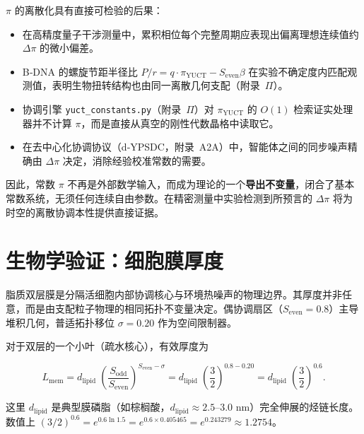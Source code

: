 \documentclass[12pt,a4paper]{article}
\theoremstyle{remark}
\begin{document}
	\(\pi\) 的离散化具有直接可检验的后果：
	\begin{itemize}
		\item 在高精度量子干涉测量中，累积相位每个完整周期应表现出偏离理想连续值约 \(\Delta\pi\) 的微小偏差。
		\item B‑DNA 的螺旋节距半径比 \(P/r = q\cdot\pi_{\mathrm{YUCT}} - S_{\mathrm{even}}\beta\) 在实验不确定度内匹配观测值，表明生物扭转结构也由同一离散几何支配（附录~\(\Pi\)）。
		\item 协调引擎 \texttt{yuct\_constants.py}（附录~\(\Pi\)）对 \(\pi_{\mathrm{YUCT}}\) 的 \(O(1)\) 检索证实处理器并不计算 \(\pi\)，而是直接从真空的刚性代数晶格中读取它。
		\item 在去中心化协调协议（d‑YPSDC，附录~A2A）中，智能体之间的同步噪声精确由 \(\Delta\pi\) 决定，消除经验校准常数的需要。
	\end{itemize}
	
	因此，常数 \(\pi\) 不再是外部数学输入，而成为理论的一个\textbf{导出不变量}，闭合了基本常数系统，无须任何连续自由参数。在精密测量中实验检测到所预言的 \(\Delta\pi\) 将为时空的离散协调本性提供直接证据。
	
	\section{生物学验证：细胞膜厚度}
	\label{sec:bio-membrane}
	
	脂质双层膜是分隔活细胞内部协调核心与环境热噪声的物理边界。其厚度并非任意，而是由支配粒子物理的相同拓扑不变量决定。偶协调扇区（\(S_{\mathrm{even}} = 0.8\)）主导堆积几何，普适拓扑移位 \(\sigma = 0.20\) 作为空间限制器。
	
	对于双层的一个小叶（疏水核心），有效厚度为
	
	\begin{equation}
		L_{\mathrm{mem}} = d_{\mathrm{lipid}} \;
		\left( \frac{S_{\mathrm{odd}}}{S_{\mathrm{even}}} \right)^{S_{\mathrm{even}} - \sigma}
		= d_{\mathrm{lipid}} \;
		\left( \frac{3}{2} \right)^{0.8 - 0.20}
		= d_{\mathrm{lipid}} \;
		\left( \frac{3}{2} \right)^{0.6}.
	\end{equation}
	
	这里 \(d_{\mathrm{lipid}}\) 是典型膜磷脂（如棕榈酸，\(d_{\mathrm{lipid}} \approx 2.5\)--\(3.0\) nm）完全伸展的烃链长度。数值上 \((3/2)^{0.6} = e^{0.6\ln 1.5} = e^{0.6 \times 0.405465} = e^{0.243279} \approx 1.2754\)。
	
\end{document}
